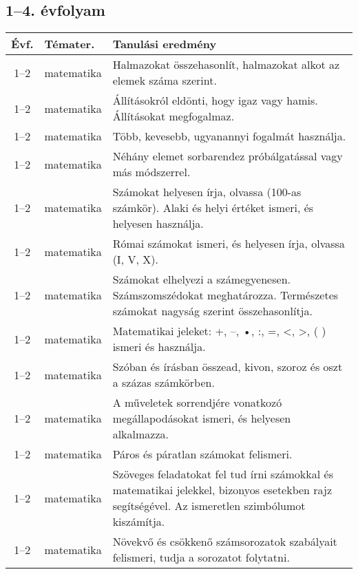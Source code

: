 \subsection{1--4. évfolyam}
\begin{small}
  \begin{longtable}{c | p{2cm} |  p{11cm} }
    \textbf{Évf.} & \textbf{Témater.} & \textbf{Tanulási eredmény} \\ \hline \hline
    \endhead

              1--2 & matematika & Halmazokat összehasonlít, halmazokat alkot az elemek száma szerint. \\ \hline
              1--2 & matematika & Állításokról eldönti, hogy igaz vagy hamis. Állításokat megfogalmaz. \\ \hline
              1--2 & matematika & Több, kevesebb, ugyanannyi fogalmát használja. \\ \hline
              1--2 & matematika & Néhány elemet sorbarendez próbálgatással vagy más módszerrel. \\ \hline
              1--2 & matematika & Számokat helyesen írja, olvassa (100-as számkör). Alaki és helyi értéket ismeri, és helyesen használja. \\ \hline
              1--2 & matematika & Római számokat ismeri, és helyesen írja, olvassa (I, V, X). \\ \hline
              1--2 & matematika & Számokat elhelyezi a számegyenesen. Számszomszédokat meghatározza. Természetes számokat nagyság szerint összehasonlítja. \\ \hline
              1--2 & matematika & Matematikai jeleket: +, –, •, :, =, <, >, ( ) ismeri és használja. \\ \hline
              1--2 & matematika & Szóban és írásban összead, kivon, szoroz és oszt a százas számkörben. \\ \hline
              1--2 & matematika & A műveletek sorrendjére vonatkozó megállapodásokat ismeri, és helyesen alkalmazza. \\ \hline
              1--2 & matematika & Páros és páratlan számokat felismeri. \\ \hline
              1--2 & matematika & Szöveges feladatokat fel tud írni számokkal és matematikai jelekkel, bizonyos esetekben rajz segítségével. Az ismeretlen szimbólumot kiszámítja. \\ \hline
              1--2 & matematika & Növekvő és csökkenő számsorozatok szabályait felismeri, tudja a sorozatot folytatni. \\ \hline

\end{longtable}
\end{small}
